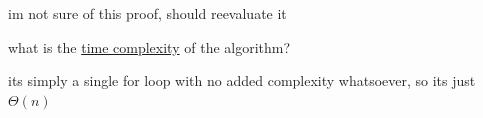 \documentclass[a4paper,12pt]{article}
\begin{document}
\begin{question}
\begin{subquestion}
\begin{answer}
\begin{enumerate}
\end{enumerate}
\begin{note}
im not sure of this proof, should reevaluate it\\
\end{note}
\end{answer}
\end{subquestion}
\begin{subquestion}
what is the \href{20221130014441-time_complexity.org}{time complexity} of the algorithm?\\
\begin{answer}
its simply a single for loop with no added complexity whatsoever, so its just \(\Theta(n)\)\\
\end{answer}
\end{subquestion}
\label{org6bb891d}
\end{question}
\end{document}
